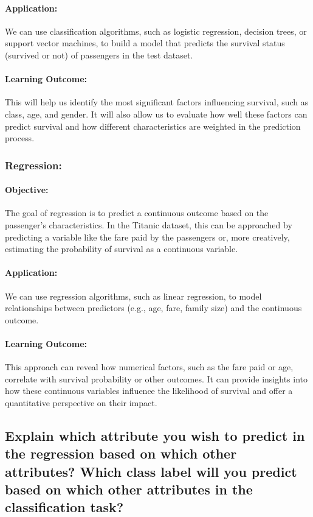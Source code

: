 \documentclass[twoside,11pt]{article}
\begin{document}
\paragraph{Application:} We can use classification algorithms, such as logistic regression, decision trees, or support vector machines, to build a model that predicts the survival status (survived or not) of passengers in the test dataset.

\paragraph{Learning Outcome:} This will help us identify the most significant factors influencing survival, such as class, age, and gender. It will also allow us to evaluate how well these factors can predict survival and how different characteristics are weighted in the prediction process.

\subsubsection*{Regression:}

\paragraph{Objective:} The goal of regression is to predict a continuous outcome based on the passenger's characteristics. In the Titanic dataset, this can be approached by predicting a variable like the fare paid by the passengers or, more creatively, estimating the probability of survival as a continuous variable.

\paragraph{Application:} We can use regression algorithms, such as linear regression, to model relationships between predictors (e.g., age, fare, family size) and the continuous outcome.

\paragraph{Learning Outcome:} This approach can reveal how numerical factors, such as the fare paid or age, correlate with survival probability or other outcomes. It can provide insights into how these continuous variables influence the likelihood of survival and offer a quantitative perspective on their impact.

\subsection*{Explain which attribute you wish to predict in the regression based on which other attributes? Which class label will you predict based on which other attributes in the classification task?}
\end{document}
